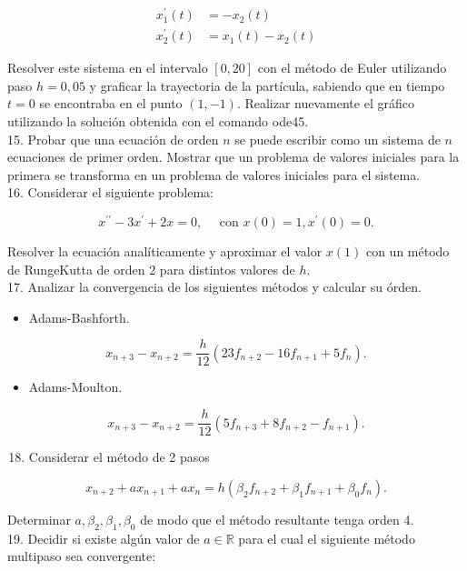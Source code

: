 \documentclass[10pt]{article}
\begin{document}
$$
\begin{aligned}
x_{1}^{\prime}(t) & =-x_{2}(t) \\
x_{2}^{\prime}(t) & =x_{1}(t)-x_{2}(t)
\end{aligned}
$$

Resolver este sistema en el intervalo $[0,20]$ con el método de Euler utilizando paso $h=0,05$ y graficar la trayectoria de la partícula, sabiendo que en tiempo $t=0$ se encontraba en el punto $(1,-1)$. Realizar nuevamente el gráfico utilizando la solución obtenida con el comando ode45.\\
15. Probar que una ecuación de orden $n$ se puede escribir como un sistema de $n$ ecuaciones de primer orden. Mostrar que un problema de valores iniciales para la primera se transforma en un problema de valores iniciales para el sistema.\\
16. Considerar el siguiente problema:

$$
x^{\prime \prime}-3 x^{\prime}+2 x=0, \quad \text { con } x(0)=1, x^{\prime}(0)=0 .
$$

Resolver la ecuación analíticamente y aproximar el valor $x(1)$ con un método de RungeKutta de orden 2 para distintos valores de $h$.\\
17. Analizar la convergencia de los siguientes métodos y calcular su órden.

\begin{itemize}
  \item Adams-Bashforth.
\end{itemize}

$$
x_{n+3}-x_{n+2}=\frac{h}{12}\left(23 f_{n+2}-16 f_{n+1}+5 f_{n}\right) .
$$

\begin{itemize}
  \item Adams-Moulton.
\end{itemize}

$$
x_{n+3}-x_{n+2}=\frac{h}{12}\left(5 f_{n+3}+8 f_{n+2}-f_{n+1}\right) .
$$

\begin{enumerate}
  \setcounter{enumi}{17}
  \item Considerar el método de 2 pasos
\end{enumerate}

$$
x_{n+2}+a x_{n+1}+a x_{n}=h\left(\beta_{2} f_{n+2}+\beta_{1} f_{n+1}+\beta_{0} f_{n}\right) .
$$

Determinar $a, \beta_{2}, \beta_{1}, \beta_{0}$ de modo que el método resultante tenga orden 4.\\
19. Decidir si existe algún valor de $a \in \mathbb{R}$ para el cual el siguiente método multipaso sea convergente:
\end{document}
